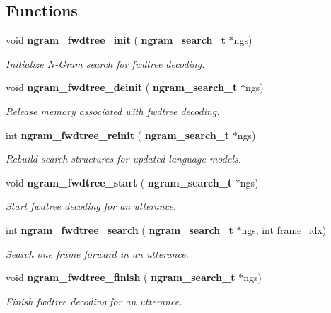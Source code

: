 \subsection*{Functions}
\begin{DoxyCompactItemize}
\item 
\mbox{\label{ngram__search__fwdtree_8c_a72c89a2a1f189495abee00e1853cddcc}} 
void \textbf{ ngram\+\_\+fwdtree\+\_\+init} (\textbf{ ngram\+\_\+search\+\_\+t} $\ast$ngs)
\begin{DoxyCompactList}\small\item\em Initialize N-\/\+Gram search for fwdtree decoding. \end{DoxyCompactList}\item 
\mbox{\label{ngram__search__fwdtree_8c_a0e0e0436b30e1074114e1d37991c5d6b}} 
void \textbf{ ngram\+\_\+fwdtree\+\_\+deinit} (\textbf{ ngram\+\_\+search\+\_\+t} $\ast$ngs)
\begin{DoxyCompactList}\small\item\em Release memory associated with fwdtree decoding. \end{DoxyCompactList}\item 
\mbox{\label{ngram__search__fwdtree_8c_aa53827b47025d4e7a63f3ddce763d84e}} 
int \textbf{ ngram\+\_\+fwdtree\+\_\+reinit} (\textbf{ ngram\+\_\+search\+\_\+t} $\ast$ngs)
\begin{DoxyCompactList}\small\item\em Rebuild search structures for updated language models. \end{DoxyCompactList}\item 
\mbox{\label{ngram__search__fwdtree_8c_af736200cd01a5d743dbab447ecc85d08}} 
void \textbf{ ngram\+\_\+fwdtree\+\_\+start} (\textbf{ ngram\+\_\+search\+\_\+t} $\ast$ngs)
\begin{DoxyCompactList}\small\item\em Start fwdtree decoding for an utterance. \end{DoxyCompactList}\item 
int \textbf{ ngram\+\_\+fwdtree\+\_\+search} (\textbf{ ngram\+\_\+search\+\_\+t} $\ast$ngs, int frame\+\_\+idx)
\begin{DoxyCompactList}\small\item\em Search one frame forward in an utterance. \end{DoxyCompactList}\item 
\mbox{\label{ngram__search__fwdtree_8c_af32a83dbb9187542577a0c500b000840}} 
void \textbf{ ngram\+\_\+fwdtree\+\_\+finish} (\textbf{ ngram\+\_\+search\+\_\+t} $\ast$ngs)
\begin{DoxyCompactList}\small\item\em Finish fwdtree decoding for an utterance. \end{DoxyCompactList}\end{DoxyCompactItemize}


